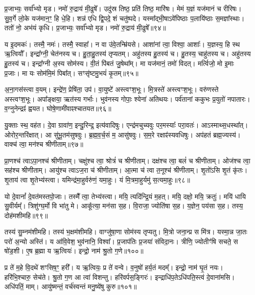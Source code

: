 प्र॒जाभ्यः॒ सर्वा᳚भ्यो मृड।
नमो॑ रु॒द्राय॑ मी॒ढुषे᳚।
उदु॑स्र तिष्ठ॒ प्रति॑ तिष्ठ॒ मारि॑षः।
मेमं य॒ज्ञं यज॑मानं च रीरिषः।
सु॒व॒र्गे लो॒के यज॑मान॒ꣳ॒ हि धे॒हि।
शन्न॑ एधि द्वि॒पदे॒ शं चतु॑ष्पदे।
यस्मा᳚द्भी॒षा\-ऽवे॑पिष्ठाः प॒लायि॑ष्ठाः स॒मज्ञा᳚स्थाः।
ततो॑ नो॒ अभ॑यं कृधि।
प्र॒जाभ्यः॒ सर्वा᳚भ्यो मृड।
नमो॑ रु॒द्राय॑ मी॒ढुषे᳚॥९४॥

य इ॒दमकः॑।
तस्मै॒ नमः॑।
तस्मै॒ स्वाहा᳚।
न वा उ॑वे॒तन्म्रि॑यसे।
आशा॑नां त्वा॒ विश्वा॒ आशाः᳚।
य॒ज्ञस्य॒ हि स्थ ऋ॒त्वियौ᳚।
इन्द्रा᳚ग्नी॒ चेत॑नस्य च।
हु॒ता॒हु॒तस्य॑ तृप्यतम्।
अहु॑तस्य हु॒तस्य॑ च।
हु॒तस्य॒ चाहु॑तस्य च।
अहु॑तस्य हु॒तस्य॑ च।
इन्द्रा᳚ग्नी अ॒स्य सोम॑स्य।
वी॒तं पि॑बतं जु॒षेथा᳚म्।
मा यज॑मानं॒ तमो॑ विदत्।
मर्त्विजो॒ मो इ॒माः प्र॒जाः।
मा यः सोम॑मि॒मं पिबा᳚त्।
सꣳसृ॑ष्टमु॒भयं॑ कृ॒तम्॥९५॥\anuvakamend[कृ॒धि॒ मी॒ढुषे\-ऽहु॑तस्य च स॒प्त च॑]

अ॒ना॒गस॑स्त्वा व॒यम्।
इन्द्रे॑ण॒ प्रेषि॑ता॒ उप॑।
वा॒युष्टे॑ अस्त्वꣳश॒भूः।
मि॒त्रस्ते॑ अस्त्वꣳश॒भूः।
वरु॑णस्ते अस्त्वꣳश॒भूः।
अपा᳚ङ्क्षया॒ ऋत॑स्य गर्भाः।
भुव॑नस्य गोपाः॒ श्येना॑ अतिथयः।
पर्व॑तानां ककुभः प्र॒युतो॑ नपातारः।
व॒ग्नुनेन्द्रꣴ॑ ह्वयत।
घोषे॒णामी॑वाꣴश्चातयत॥९६॥

यु॒क्ताः स्थ॒ वह॑त।
दे॒वा ग्रावा॑ण॒ इन्दु॒रिन्द्र॒ इत्य॑वादिषुः।
एन्द्र॑मचुच्यवुः पर॒मस्याः᳚ परा॒वतः॑।
आऽस्माथ्स॒धस्था᳚त्।
ओरोर॒न्तरि॑क्षात्।
आ सु॑भू॒तम॑सुषवुः।
ब्र॒ह्म॒व॒र्च॒सं म॒ आसु॑षवुः।
स॒म॒रे रक्षाꣴ॑स्यवधिषुः।
अप॑हतं ब्रह्म॒ज्यस्य॑।
वाक्च॑ त्वा॒ मन॑श्च श्रीणीताम्॥९७॥

प्रा॒णश्च॑ त्वा\-ऽपा॒नश्च॑ श्रीणीताम्।
चक्षु॑श्च त्वा॒ श्रोत्रं॑ च श्रीणीताम्।
दक्ष॑श्च त्वा॒ बलं॑ च श्रीणीताम्।
ओज॑श्च त्वा॒ सह॑श्च श्रीणीताम्।
आयु॑श्च त्वा\-ऽज॒रा च॑ श्रीणीताम्।
आ॒त्मा च॑ त्वा त॒नूश्च॑ श्रीणीताम्।
शृ॒तो॑ऽसि शृ॒तं कृ॑तः।
शृ॒ताय॑ त्वा शृ॒तेभ्य॑स्त्वा।
यमिन्द्र॑मा॒हुर्वरु॑णं॒ यमा॒हुः।
यं मि॒त्रमा॒हुर्यमु॑ स॒त्यमा॒हुः॥९८॥

यो दे॒वानां᳚ दे॒वत॑मस्तपो॒जाः।
तस्मै᳚ त्वा॒ तेभ्य॑स्त्वा।
मयि॒ त्यदि॑न्द्रि॒यं म॒हत्।
मयि॒ दक्षो॒ मयि॒ क्रतुः॑।
मयि॑ धायि सु॒वीर्यम्᳚।
त्रिशु॑ग्घ॒र्मो वि भा॑तु मे।
आकू᳚त्या॒ मन॑सा स॒ह।
वि॒राजा॒ ज्योति॑षा स॒ह।
य॒ज्ञेन॒ पय॑सा स॒ह।
तस्य॒ दोह॑मशीमहि॥९९॥

तस्य॑ सु॒म्नम॑शीमहि।
तस्य॑ भ॒क्षम॑शीमहि।
वाग्जु॑षा॒णा सोम॑स्य तृप्यतु।
मि॒त्रो जना॒न्प्र स मि॑त्र।
यस्मा॒न्न जा॒तः परो॑ अ॒न्यो अस्ति॑।
य आ॑वि॒वेश॒ भुव॑नानि॒ विश्वा᳚।
प्र॒जा\-प॑तिः प्र॒जया॑ संविदा॒नः।
त्रीणि॒ ज्योतीꣳ॑षि सचते॒ स षो॑ड॒शी।
ए॒ष ब्र॒ह्मा य ऋ॒त्वियः॑।
इन्द्रो॒ नाम॑ श्रु॒तो ग॒णे॥१००॥

प्र ते॑ म॒हे वि॒दथे॑ शꣳसिष॒ꣳ॒ हरी᳚।
य ऋ॒त्वियः॒ प्र ते॑ वन्वे।
व॒नुषो॑ हर्य॒तं मदम्᳚।
इन्द्रो॒ नाम॑ घृ॒तं नयः।
हरि॑भि॒श्चारु॒ सेच॑ते।
श्रु॒तो ग॒ण आ त्वा॑ विशन्तु।
हरि॑वर्पस॒ङ्गिरः॑।
इन्द्राधि॑प॒ते\-ऽधि॑पति॒स्त्वं दे॒वाना॑मसि।
अधि॑पतिं॒ माम्।
आयु॑ष्मन्तं॒ वर्च॑स्वन्तं मनु॒ष्ये॑षु कुरु॥१०१॥

